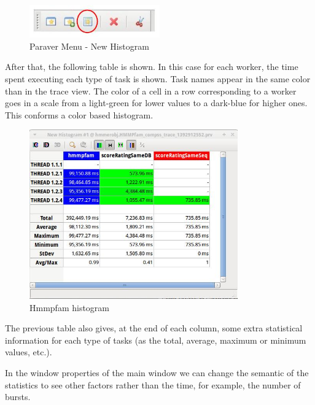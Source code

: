 \begin{figure}[ht!]
  \centering
    \includegraphics[width=0.5\textwidth]{./Sections/4_Tools/Figures/12.jpeg}
    \caption{Paraver Menu - New Histogram}
\end{figure}

After that, the following table is shown. In this case for each worker, the time spent 
executing each type of task is shown. Task names appear in the same color than in the 
trace view. The color of a cell in a row corresponding to a worker goes in a scale from 
a light-green for lower values to a dark-blue for higher ones. This conforms a color based histogram.

\begin{figure}[ht!]
  \centering
    \includegraphics[width=0.8\textwidth]{./Sections/4_Tools/Figures/13.jpeg}
    \caption{Hmmpfam histogram}
\end{figure}
 
The previous table also gives, at the end of each column, some extra statistical 
information for each type of tasks (as the total, average, maximum or minimum values, etc.).

\newpage
In the window properties of the main window we can change the semantic of the statistics 
to see other factors rather than the time, for example, the number of bursts.

